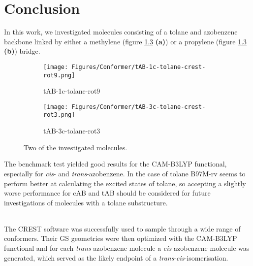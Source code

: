\chapter{Conclusion}
In this work, we investigated molecules consisting of a tolane and azobenzene backbone
linked by either a methylene (figure \ref{fig:summary_total} \textbf{(a)}) or a propylene (figure \ref{fig:summary_total} \textbf{(b)}) bridge.
%
\begin{figure}[H]
\centering
\begin{subfigure}{.33\textwidth}
  \centering
  \texttt{[image: Figures/Conformer/tAB-1c-tolane-crest-rot9.png]}
  \caption{tAB-1c-tolane-rot9}
  \label{fig:summary_a}
\end{subfigure}
\begin{subfigure}{.33\textwidth}
  \centering
  \texttt{[image: Figures/Conformer/tAB-3c-tolane-crest-rot3.png]}
  \caption{tAB-3c-tolane-rot3}
  \label{fig:summary_b}
\end{subfigure}%
\caption{Two of the investigated molecules.}
\label{fig:summary_total}
\end{figure}
The benchmark test yielded good results for the CAM-B3LYP functional, especially for \textit{cis}- and \textit{trans}-azobenzene. In the case of tolane B97M-rv seems to perform better at calculating the excited states of tolane, so accepting a slightly worse performance for cAB and tAB should be considered for future investigations of molecules with a tolane substructure. 
%
\begin{comment}
- For cis and trans AB CAM-B3LYP performed quite well, but for tolane B97 seems to be the better functional

An alternative functional one could use would be the B97M-rV, since it performed espe-
cially well for tolane with some deficits concerning tAB.
\end{comment}
%
\\
The CREST software was successfully used to sample through a wide range of conformers. Their GS geometries were then optimized with the CAM-B3LYP functional and for each \textit{trans}-azobenzene molecule a \textit{cis}-azobenzene molecule was generated, which served as the likely endpoint of a \textit{trans}-\textit{cis}-isomerisation. 
%
%
\begin{comment}
- we could successfully use CREST to sample through a wide range of conformers and could select those with the lowest energies
- those were used to construct the thermodynamical isomerisation of trans cis AB
\end{comment}

